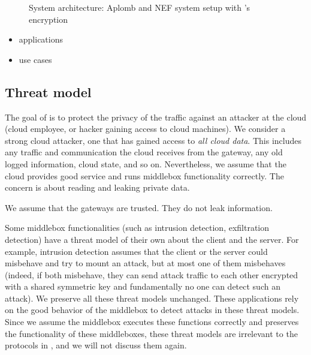 \begin{figure}[t!]
\centering
{}
%
\vfill  
{}
%
\caption{System architecture: Aplomb and NEF system setup with \sys's encryption \label{fig:sys-overview}}
\end{figure}

\begin{itemize}
\item applications
\item use cases
\end{itemize}

\subsection{Threat model}

The goal of \sys is to protect the privacy of the traffic against an attacker at the cloud 
(cloud employee, or hacker gaining access to cloud machines). 
We consider a strong cloud attacker, one that has gained access to {\em all cloud data}.
This includes any traffic and communication the cloud receives from the 
gateway, any old logged information, cloud state, and so on. Nevertheless, we assume that 
the cloud provides good service and runs middlebox functionality correctly.  The concern is
about reading and leaking private data. 

We assume that the gateways are trusted. They do not leak information.


Some middlebox functionalities (such as intrusion detection, exfiltration detection) have a threat model
of their own about the client and the server. For example, intrusion detection assumes that 
the client or the server could misbehave and try to mount an attack, but at most one of them misbehaves 
(indeed, if both misbehave, they can send attack traffic to each other encrypted with a shared symmetric key and fundamentally
no one can detect such an attack).  We preserve all these threat models unchanged. These applications rely
on the good behavior of the middlebox to detect attacks in these threat models. Since we assume the middlebox executes
these functions correctly and \sys preserves the functionality of these middleboxes, 
these threat models are irrelevant to the protocols in \sys, and we will not discuss them again. 



